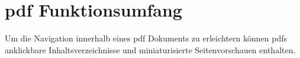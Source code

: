 \section{\gls{pdf} Funktionsumfang}
Um die Navigation innerhalb eines \gls{pdf} Dokuments zu erleichtern können \gls{pdf}s anklickbare Inhaltsverzeichnisse und miniaturisierte Seitenvorschauen enthalten.